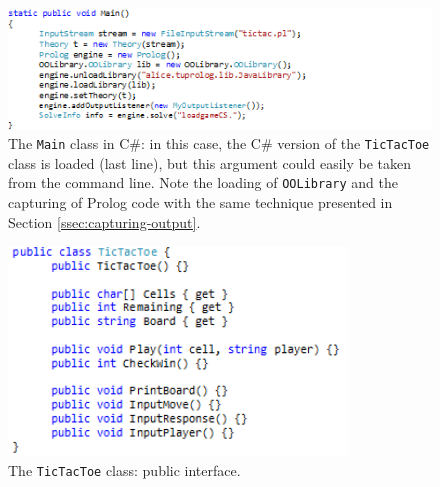 \begin{figure}[h]
   \centering
  \includegraphics[width=14cm]{images/dotnet-pipolo5}
  \caption{The \texttt{Main} class in C\#: in this case, the C\# version of the \texttt{TicTacToe} class is loaded (last line), but this argument could easily be taken from the command line. Note the loading of \texttt{OOLibrary} and the capturing of Prolog code with the same technique presented in Section \ref{ssec:capturing-output}.}
  \label{fig:dotnet-pipolo5}
\end{figure}

\begin{figure}
   \centering
  \includegraphics[width=9cm]{images/dotnet-pipolo2}
  \caption{The \texttt{TicTacToe} class: public interface.}\label{fig:dotnet-pipolo2}
\end{figure}

